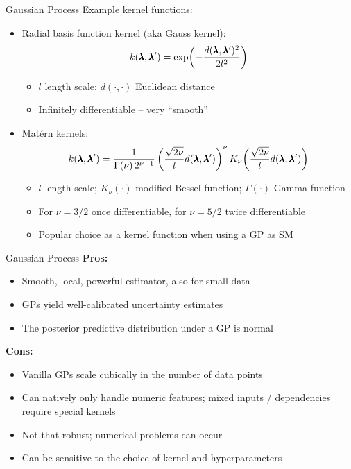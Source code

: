 \documentclass[main]{subfiles}
\begin{document}
\begin{frame}{Gaussian Process}
    \small
    Example kernel functions:
    \begin{itemize}
        \item Radial basis function kernel (aka Gauss kernel):
        $$k(\pmb{\lambda}, \pmb{\lambda}') = \exp\!\left(-\frac{d(\pmb{\lambda}, \pmb{\lambda}')^2}{2 l^2}\right)$$
        \begin{itemize}
            \item $l$ length scale; $d(\cdot, \cdot)$ Euclidean distance
            \item Infinitely differentiable -- very ``smooth''
        \end{itemize}
        \item Matérn kernels:
        $$k(\pmb{\lambda}, \pmb{\lambda}') = \frac{1}{\Gamma(\nu)\, 2^{\nu-1}}\left(\frac{\sqrt{2\nu}}{l} d(\pmb{\lambda}, \pmb{\lambda}')\right)^\nu K_\nu\!\left(\frac{\sqrt{2\nu}}{l} d(\pmb{\lambda}, \pmb{\lambda}')\right)$$
        \begin{itemize}
            \item $l$ length scale; $K_\nu(\cdot)$ modified Bessel function; $\Gamma(\cdot)$ Gamma function
            \item For $\nu = 3/2$ once differentiable, for $\nu = 5/2$ twice differentiable
            \item Popular choice as a kernel function when using a GP as SM
        \end{itemize}
    \end{itemize}
\end{frame}


\begin{frame}{Gaussian Process}
    \textbf{Pros:}
    \begin{itemize}
        \item Smooth, local, powerful estimator, also for small data
        \item GPs yield well-calibrated uncertainty estimates
        \item The posterior predictive distribution under a GP is normal
    \end{itemize}
    \textbf{Cons:}
    \begin{itemize}
        \item Vanilla GPs scale cubically in the number of data points
        \item Can natively only handle numeric features; mixed inputs / dependencies require special kernels
        \item Not that robust; numerical problems can occur
        \item Can be sensitive to the choice of kernel and hyperparameters
    \end{itemize}
\end{frame}
\end{document}

